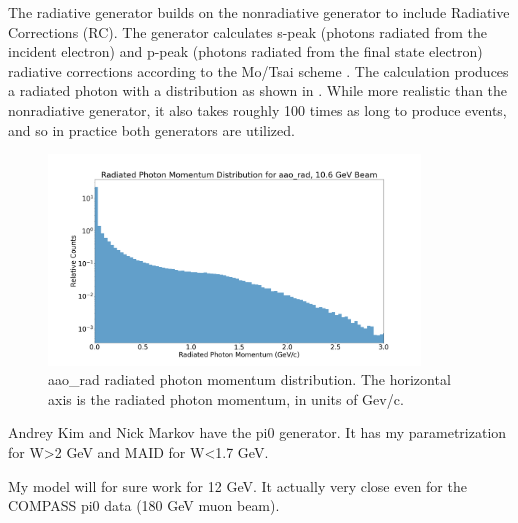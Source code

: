 The radiative generator builds on the nonradiative generator to include Radiative Corrections (RC). The generator calculates s-peak (photons radiated from the incident electron) and p-peak (photons radiated from the final state electron) radiative corrections according to the Mo/Tsai scheme \parencite{Mo1969RadiativeScattering}. The calculation produces a radiated photon with a distribution as shown in . While more realistic than the nonradiative generator, it also takes roughly 100 times as long to produce events, and so in practice both generators are utilized. 


    \begin{figure}
        \centering
        \includegraphics[trim={2cm 1.25cm 2cm 2.5cm},clip,width=0.879\textwidth]{Chapters/Ch3-Simulations/event_generation/pics/radiated_photon_momentum.png}
        \caption[aao\_rad radiated photon momentum distribution]{aao\_rad radiated photon momentum distribution. The horizontal axis is the radiated photon momentum, in units of Gev/c.}
        \label{fig:aao_rad_mom_distribution}
    \end{figure}
    
    

\iffalse
Andrey Kim and Nick Markov have the pi0 generator. It has my parametrization for W>2 GeV and MAID for W<1.7 GeV.

My model will for sure work for 12 GeV. It actually very close even for the COMPASS pi0 data (180 GeV muon beam).

